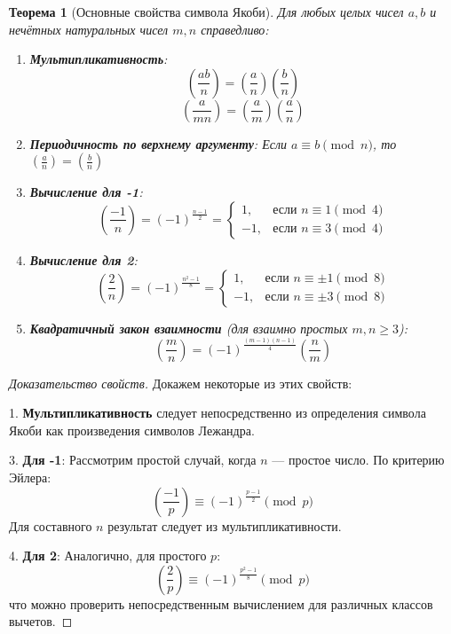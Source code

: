 \documentclass[12pt,a4paper]{article}
\newtheorem{theorem}{Теорема}
\begin{document}
\begin{theorem}[Основные свойства символа Якоби]
Для любых целых чисел $a, b$ и нечётных натуральных чисел $m, n$ справедливо:
\begin{enumerate}
\item \textbf{Мультипликативность}:
\[ \left(\frac{ab}{n}\right) = \left(\frac{a}{n}\right)\left(\frac{b}{n}\right) \]
\[ \left(\frac{a}{mn}\right) = \left(\frac{a}{m}\right)\left(\frac{a}{n}\right) \]

\item \textbf{Периодичность по верхнему аргументу}:
Если $a \equiv b \pmod{n}$, то $\left(\frac{a}{n}\right) = \left(\frac{b}{n}\right)$

\item \textbf{Вычисление для -1}:
\[ \left(\frac{-1}{n}\right) = (-1)^{\frac{n-1}{2}} = 
\begin{cases}
1, & \text{если } n \equiv 1 \pmod{4} \\
-1, & \text{если } n \equiv 3 \pmod{4}
\end{cases} \]

\item \textbf{Вычисление для 2}:
\[ \left(\frac{2}{n}\right) = (-1)^{\frac{n^2-1}{8}} = 
\begin{cases}
1, & \text{если } n \equiv \pm 1 \pmod{8} \\
-1, & \text{если } n \equiv \pm 3 \pmod{8}
\end{cases} \]

\item \textbf{Квадратичный закон взаимности} (для взаимно простых $m, n \geq 3$):
\[ \left(\frac{m}{n}\right) = (-1)^{\frac{(m-1)(n-1)}{4}} \left(\frac{n}{m}\right) \]
\end{enumerate}
\end{theorem}

\begin{proof}[Доказательство свойств]
Докажем некоторые из этих свойств:

1. \textbf{Мультипликативность} следует непосредственно из определения символа Якоби как произведения символов Лежандра.

3. \textbf{Для -1}: Рассмотрим простой случай, когда $n$ — простое число. По критерию Эйлера:
\[ \left(\frac{-1}{p}\right) \equiv (-1)^{\frac{p-1}{2}} \pmod{p} \]
Для составного $n$ результат следует из мультипликативности.

4. \textbf{Для 2}: Аналогично, для простого $p$:
\[ \left(\frac{2}{p}\right) \equiv (-1)^{\frac{p^2-1}{8}} \pmod{p} \]
что можно проверить непосредственным вычислением для различных классов вычетов.
\end{proof}
\end{document}
